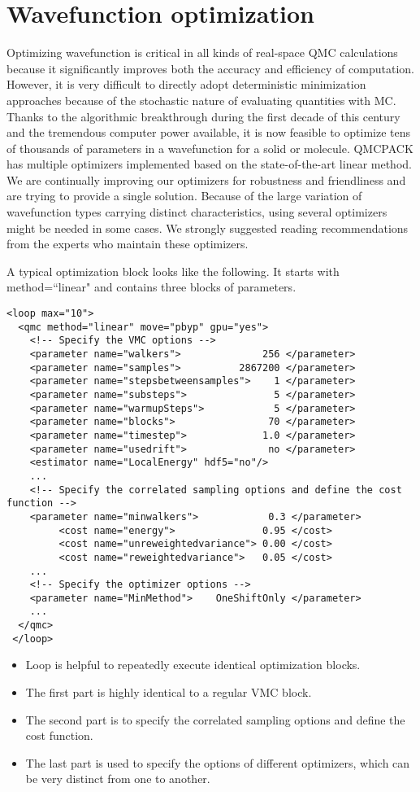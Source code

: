 \section{Wavefunction optimization}
\label{sec:optimization}

Optimizing wavefunction is critical in all kinds of real-space QMC calculations
because it significantly improves both the accuracy and efficiency of computation.
However, it is very difficult to directly adopt deterministic minimization approaches because of the stochastic nature of evaluating quantities with MC.
Thanks to the algorithmic breakthrough during the first decade of this century and the tremendous computer power available, 
it is now feasible to optimize tens of thousands of parameters in a wavefunction for a solid or molecule.
QMCPACK has multiple optimizers implemented based on the state-of-the-art linear method.
We are continually improving our optimizers for robustness and friendliness and are trying to provide a single solution.
Because of the large variation of wavefunction types carrying distinct characteristics, using several optimizers might be needed in some cases.
We strongly suggested reading recommendations from the experts who maintain these optimizers.

A typical optimization block looks like the following. It starts with method=``linear" and contains three blocks of parameters.
\begin{lstlisting}[style=QMCPXML]
 <loop max="10">
  <qmc method="linear" move="pbyp" gpu="yes">
    <!-- Specify the VMC options -->
    <parameter name="walkers">              256 </parameter>
    <parameter name="samples">          2867200 </parameter>
    <parameter name="stepsbetweensamples">    1 </parameter>
    <parameter name="substeps">               5 </parameter>
    <parameter name="warmupSteps">            5 </parameter>
    <parameter name="blocks">                70 </parameter>
    <parameter name="timestep">             1.0 </parameter>
    <parameter name="usedrift">              no </parameter>
    <estimator name="LocalEnergy" hdf5="no"/>
    ...
    <!-- Specify the correlated sampling options and define the cost function -->
    <parameter name="minwalkers">            0.3 </parameter>
         <cost name="energy">               0.95 </cost>
         <cost name="unreweightedvariance"> 0.00 </cost>
         <cost name="reweightedvariance">   0.05 </cost>
    ...
    <!-- Specify the optimizer options -->
    <parameter name="MinMethod">    OneShiftOnly </parameter>
    ...
  </qmc>
 </loop>
\end{lstlisting}
\begin{itemize}
\item Loop is helpful to repeatedly execute identical optimization blocks.
\item The first part is highly identical to a regular VMC block.
\item The second part is to specify the correlated sampling options and define the cost function.
\item The last part is used to specify the options of different optimizers, which can be very distinct from one to another.
\end{itemize}


